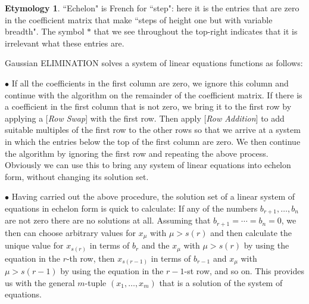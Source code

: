 \documentclass[11pt]{amsbook}
\theoremstyle{definition}
\newtheorem*{etym}{Etymology}
\begin{document}
\begin{etym}``Echelon" is French for ``step": here it is the entries that are zero in the coefficient matrix that make ``steps of height one but with variable breadth". The symbol $*$ that we see throughout the top-right indicates that it is irrelevant what these entries are.
\end{etym}

\noindent
{Gaussian ELIMINATION}
\label{gaussalg} solves a system of linear equations functions as follows:
\smallskip

$\bullet$ If all the coefficients in the first column are zero, we ignore this column and continue with the algorithm on the remainder of the coefficient matrix. If there is a coefficient in the first column that is not zero, we bring it to the first row by applying a [{\it Row Swap}] with the first row. Then apply [{\it Row Addition}] to add suitable multiples of the first row to the other rows so that we arrive at a system in which the entries below the top of the first column are zero. We then continue the algorithm by ignoring the first row and repeating the above process.
Obviously we can use this to bring any system of linear equations into echelon form, without changing its solution set.
\smallskip

$\bullet$ Having carried out the above procedure, the solution set of a linear system of equations in echelon form is quick to calculate: If any of the numbers $b_{r+1} , \ldots , b_n$ are not zero there are no solutions at all. Assuming that $b_{r+1} = \cdots = b_n = 0$, we then can choose arbitrary values for $x_{\mu}$ with $\mu > s(r)$ and then calculate the unique value for $x_{s(r)}$ in terms of $b_r$ and the $x_{\mu}$ with $\mu > s(r)$ by using the equation in the $r$-th row, then $x_{s(r-1)}$ in terms of $b_{r-1}$ and $x_{\mu}$ with $\mu > s(r-1)$ by using the equation in the $r-1$-st row, and so on. This provides us with the general $m$-tuple $(x_1, \ldots , x_m)$ that is a solution of the system of equations.
\medskip
\end{document}
